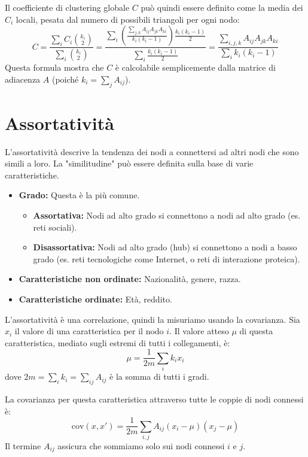 \noindent Il coefficiente di clustering globale $C$ può quindi essere definito come la media dei $C_i$ locali, pesata dal numero di possibili triangoli per ogni nodo:
\begin{equation}
C = \frac{\sum_i C_i \binom{k_i}{2}}{\sum_i \binom{k_i}{2}} = \frac{\sum_i \left( \frac{\sum_{j,k} A_{ij} A_{jk} A_{ki}}{k_i(k_i-1)} \right) \frac{k_i(k_i-1)}{2}}{\sum_i \frac{k_i(k_i-1)}{2}} = \frac{\sum_{i,j,k} A_{ij} A_{jk} A_{ki}}{\sum_i k_i(k_i-1)}
\end{equation}
Questa formula mostra che $C$ è calcolabile semplicemente dalla matrice di adiacenza $A$ (poiché $k_i = \sum_j A_{ij}$).

\section{Assortatività}
L'assortatività descrive la tendenza dei nodi a connettersi ad altri nodi che sono simili a loro. La "similitudine" può essere definita sulla base di varie caratteristiche.
\begin{itemize}
\item \textbf{Grado:} Questa è la più comune.
\begin{itemize}
\item \textbf{Assortativa:} Nodi ad alto grado si connettono a nodi ad alto grado (es. reti sociali).
\item \textbf{Disassortativa:} Nodi ad alto grado (hub) si connettono a nodi a basso grado (es. reti tecnologiche come Internet, o reti di interazione proteica).
\end{itemize}
\item \textbf{Caratteristiche non ordinate:} Nazionalità, genere, razza.
\item \textbf{Caratteristiche ordinate:} Età, reddito.
\end{itemize}

L'assortatività è una correlazione, quindi la misuriamo usando la covarianza. Sia $x_i$ il valore di una caratteristica per il nodo $i$. Il valore atteso $\mu$ di questa caratteristica, mediato sugli estremi di tutti i collegamenti, è:
\begin{equation}
\mu = \frac{1}{2m} \sum_i k_i x_i
\end{equation}
dove $2m = \sum_i k_i = \sum_{ij} A_{ij}$ è la somma di tutti i gradi.

\noindent La covarianza per questa caratteristica attraverso tutte le coppie di nodi connessi è:
\begin{equation}
\text{cov}(x, x') = \frac{1}{2m} \sum_{i,j} A_{ij} (x_i - \mu)(x_j - \mu)
\end{equation}
Il termine $A_{ij}$ assicura che sommiamo solo sui nodi connessi $i$ e $j$.

